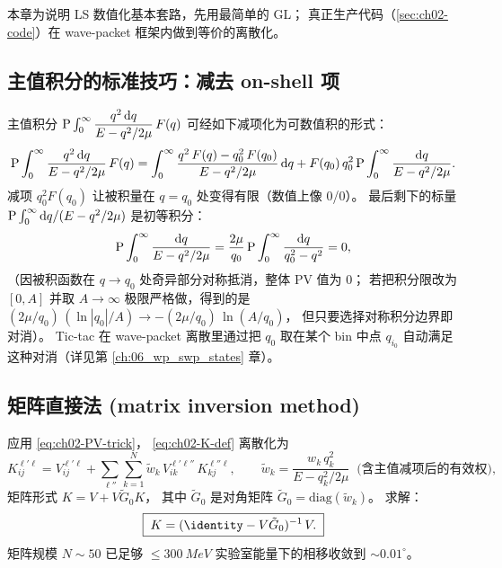 本章为说明 LS 数值化基本套路，先用最简单的 GL；
真正生产代码（\cref{sec:ch02-code}）在 wave-packet 框架内做到等价的离散化。

\subsection{主值积分的标准技巧：减去 on-shell 项}

主值积分
$\mathrm{P} \int_0^\infty \dfrac{q^2\,\dd q}{E - q^2/2\mu}\, F(q)$
可经如下减项化为可数值积的形式：
\begin{equation}
  \mathrm{P} \int_0^\infty \frac{q^2\, \dd q}{E - q^2/2\mu}\, F(q)
  = \int_0^\infty \frac{q^2\, F(q) - q_0^2\, F(q_0)}{E - q^2/2\mu}\, \dd q
   + F(q_0)\, q_0^2\, \mathrm{P} \int_0^\infty \frac{\dd q}{E - q^2/2\mu}.
  \label{eq:ch02-PV-trick}
\end{equation}
减项 $q_0^2 F(q_0)$ 让被积量在 $q = q_0$ 处变得有限（数值上像 0/0）。
最后剩下的标量 $\mathrm{P} \int_0^\infty \dd q / (E - q^2/2\mu)$ 是初等积分：
\begin{equation}
  \mathrm{P} \int_0^\infty \frac{\dd q}{E - q^2/2\mu}
  = \frac{2\mu}{q_0}\, \mathrm{P} \int_0^\infty \frac{\dd q}{q_0^2 - q^2}
  = 0,
  \label{eq:ch02-PV-zero}
\end{equation}
（因被积函数在 $q \to q_0$ 处奇异部分对称抵消，整体 PV 值为 0；
若把积分限改为 $[0, A]$ 并取 $A \to \infty$ 极限严格做，得到的是
$(2\mu/q_0)\,(\ln|q_0|/A) \to -(2\mu/q_0)\,\ln(A/q_0)$，
但只要选择对称积分边界即对消）。
Tic-tac 在 wave-packet 离散里通过把 $q_0$ 取在某个 bin 中点 $q_{i_0}$
自动满足这种对消（详见第 \ref{ch:06_wp_swp_states} 章）。

\subsection{矩阵直接法 (matrix inversion method)}

应用 \cref{eq:ch02-PV-trick}，
\cref{eq:ch02-K-def} 离散化为
\begin{equation}
  K_{ij}^{\ell'\ell}
  = V_{ij}^{\ell'\ell}
  + \sum_{\ell''} \sum_{k=1}^{N}
       \tilde{w}_k\, V_{ik}^{\ell'\ell''}\, K_{kj}^{\ell''\ell},
  \qquad
  \tilde{w}_k = \frac{w_k\, q_k^2}{E - q_k^2/2\mu}\;\;\text{(含主值减项后的有效权)},
  \label{eq:ch02-K-discrete}
\end{equation}
矩阵形式
$K = V + V \tilde{G}_0 K$，
其中 $\tilde{G}_0$ 是对角矩阵 $\tilde{G}_0 = \mathrm{diag}(\tilde{w}_k)$。
求解：
\begin{equation}
  \boxed{\; K = (\identity - V \tilde{G}_0)^{-1}\, V. \;}
  \label{eq:ch02-K-solve}
\end{equation}
矩阵规模 $N \sim 50$ 已足够 $\le \SI{300}{MeV}$ 实验室能量下的相移收敛到 $\sim 0.01^\circ$。


